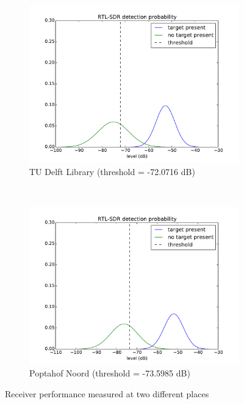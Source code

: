 \begin{figure}[H]
    \centering
    \begin{subfigure}[b]{0.45\textwidth}
        \includegraphics[width=\textwidth]{figures/lib-auto-pdf}
        \caption{TU Delft Library (threshold = -72.0716 dB)}
        \label{fig:lib-pdf}
    \end{subfigure}
    ~ %
    \begin{subfigure}[b]{0.45\textwidth}
        \includegraphics[width=\textwidth]{figures/popta-auto-pdf}
        \caption{Poptahof Noord (threshold = -73.5985 dB)}
        \label{fig:popta-pdf}
    \end{subfigure}
    \caption{Receiver performance measured at two different places}\label{fig:all-pdf}
\end{figure}

